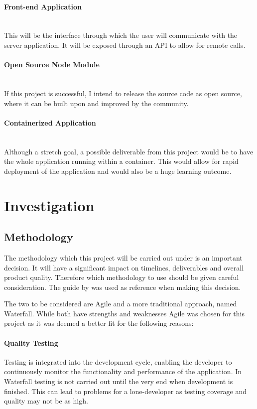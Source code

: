 \documentclass{article}
\begin{document}
\paragraph{Front-end Application}\mbox{}\\
This will be the interface through which the user will communicate with the server application. It will be exposed through an API to allow for remote calls.

\paragraph{Open Source Node Module}\mbox{}\\
If this project is successful, I intend to release the source code as open source, where it can be built upon and improved by the community.

\paragraph{Containerized Application}\mbox{}\\
Although a stretch goal, a possible deliverable from this project would be to have the whole application running within a container. This would allow for rapid deployment of the application and would also be a huge learning outcome.


\section{Investigation}

\subsection{Methodology}
\label{subs:agile}

The methodology which this project will be carried out under is an important decision. It will have a significant impact on timelines, deliverables and overall product quality. Therefore which methodology to use should be given careful consideration. The guide by \citep{Manifesto2016} was used as reference when making this decision.

The two to be considered are Agile and a more traditional approach, named Waterfall. While both have strengths and weaknesses Agile was chosen for this project as it was deemed a better fit for the following reasons:

\paragraph{Quality Testing} Testing is integrated into the development cycle, enabling the developer to continuously monitor the functionality and performance of the application. In Waterfall testing is not carried out until the very end when development is finished. This can lead to problems for a lone-developer as testing coverage and quality may not be as high. 
\end{document}
